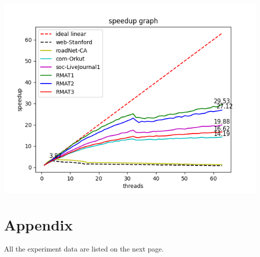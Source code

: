 \documentclass[10pt,twocolumn,letterpaper]{article}
\begin{document}
\begin{strip}
    \centering
    \includegraphics[scale=0.8]{figures/speedup.png}
\end{strip}

\newpage



\section{Appendix}

All the experiment data are listed on the next page.

\newpage
\end{document}
